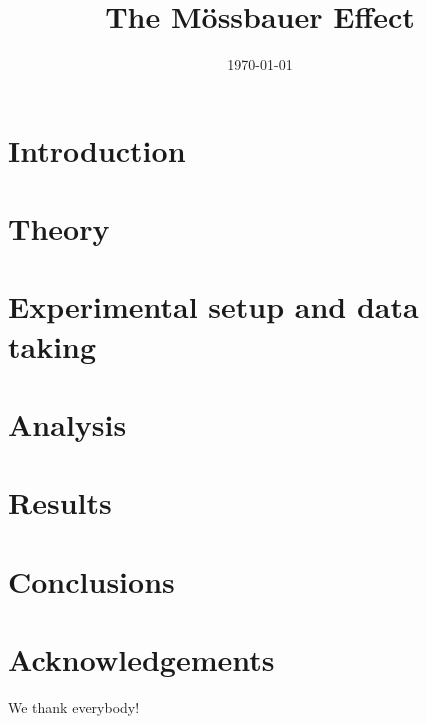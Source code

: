 \documentclass{atlasnote}
\title{The M\"ossbauer Effect}
\date{\today}
\begin{document}


\tableofcontents

\newpage

\section{Introduction}
\label{sec:intro}


\section{Theory}
\label{sec:theory}


\section{Experimental setup and data taking}
\label{sec:daq}


\section{Analysis}
\label{sec:analysis}


\section{Results}
\label{sec:results}


\section{Conclusions}
\label{sec:conclusion}


\section*{Acknowledgements}
We thank everybody!




\end{document}
